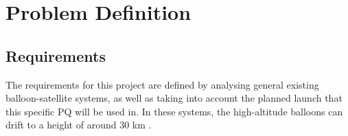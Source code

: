 \chapter{Problem Definition}

\section{Requirements}

The requirements for this project are defined by analysing general existing balloon-satellite systems, as well as taking into account the planned launch that this specific PQ will be used in. In these systems, the high-altitude balloons can drift to a height of around 30 km \cite{weatherWeatherBalloons}.